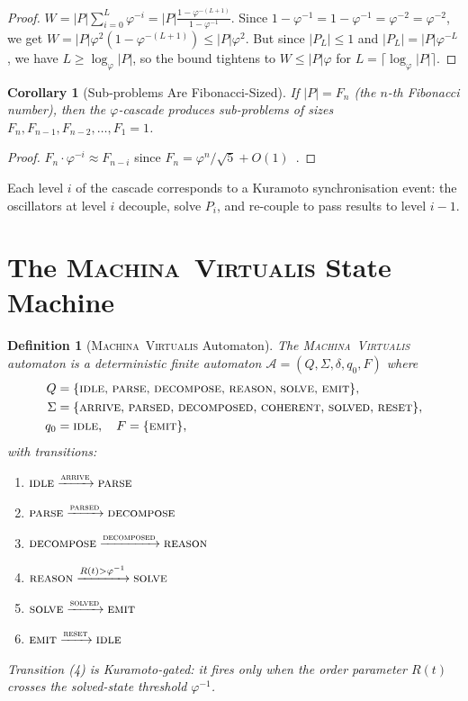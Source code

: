\documentclass[12pt]{article}
\newtheorem{corollary}[theorem]{Corollary}
\newtheorem{definition}[theorem]{Definition}
\newcommand{\PHI}{\varphi}
\newcommand{\PHIINV}{\varphi^{-1}}
\newcommand{\AMOR}{\varphi^{-2}}
\newcommand{\MV}{\textsc{Machina~Virtualis}}
\begin{document}
\begin{proof}
$W = |P|\sum_{i=0}^{L}\PHI^{-i} = |P|\frac{1-\PHI^{-(L+1)}}{1-\PHI^{-1}}$.
Since $1 - \PHI^{-1} = 1 - \PHIINV = \AMOR = \PHI^{-2}$, we get
$W = |P|\PHI^2(1-\PHI^{-(L+1)}) \le |P|\PHI^2$.  But since $|P_L| \le 1$ and
$|P_L| = |P|\PHI^{-L}$, we have $L \ge \log_\PHI|P|$, so the bound tightens to
$W \le |P|\PHI$ for $L = \lceil\log_\PHI|P|\rceil$.
\end{proof}

\begin{corollary}[Sub-problems Are Fibonacci-Sized]
If $|P| = F_n$ (the $n$-th Fibonacci number), then the $\varphi$-cascade
produces sub-problems of sizes $F_n, F_{n-1}, F_{n-2}, \ldots, F_1 = 1$.
\end{corollary}

\begin{proof}
$F_n \cdot \PHI^{-i} \approx F_{n-i}$ since $F_n = \PHI^n/\sqrt{5} +
O(1)$~\cite{Knuth1997}.
\end{proof}

Each level $i$ of the cascade corresponds to a Kuramoto synchronisation event:
the oscillators at level $i$ decouple, solve $P_i$, and re-couple to pass
results to level $i-1$.

\section{The \MV{} State Machine}
\label{sec:machina}

\begin{definition}[\MV{} Automaton]
\label{def:machina}
The \emph{\MV{} automaton} is a deterministic finite automaton $\mathcal{A} =
(Q, \Sigma, \delta, q_0, F)$ where
\begin{align*}
  Q &= \{\textsc{idle},\,\textsc{parse},\,\textsc{decompose},\,
          \textsc{reason},\,\textsc{solve},\,\textsc{emit}\}, \\
  \Sigma &= \{\textsc{arrive},\,\textsc{parsed},\,\textsc{decomposed},\,
             \textsc{coherent},\,\textsc{solved},\,\textsc{reset}\}, \\
  q_0 &= \textsc{idle},\quad F = \{\textsc{emit}\},
\end{align*}
with transitions:
\begin{enumerate}[label=(\arabic*)]
  \item $\textsc{idle} \xrightarrow{\textsc{arrive}} \textsc{parse}$
  \item $\textsc{parse} \xrightarrow{\textsc{parsed}} \textsc{decompose}$
  \item $\textsc{decompose} \xrightarrow{\textsc{decomposed}} \textsc{reason}$
  \item $\textsc{reason} \xrightarrow{R(t) > \PHIINV} \textsc{solve}$
  \item $\textsc{solve} \xrightarrow{\textsc{solved}} \textsc{emit}$
  \item $\textsc{emit} \xrightarrow{\textsc{reset}} \textsc{idle}$
\end{enumerate}
Transition (4) is \emph{Kuramoto-gated}: it fires only when the order parameter
$R(t)$ crosses the solved-state threshold $\PHIINV$.
\end{definition}
\end{document}
